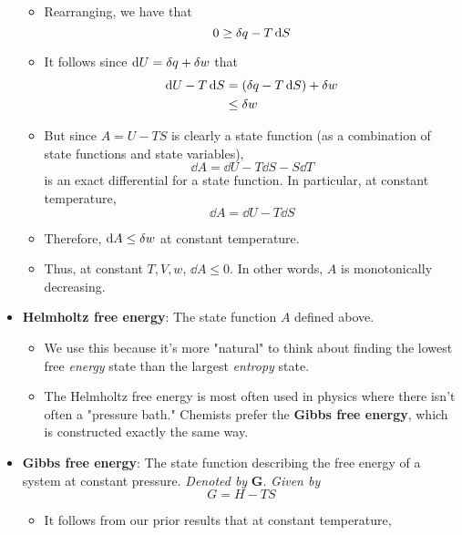 \documentclass[../notes.tex]{subfiles}
\begin{document}
\begin{itemize}
\begin{itemize}
        \item Rearranging, we have that
        \begin{equation*}
            0 \geq \var{q}-T\dd{S}
        \end{equation*}
        \item It follows since $\dd{U}=\var{q}+\var{w}$ that
        \begin{align*}
            \dd{U}-T\dd{S} &= (\var{q}-T\dd{S})+\var{w}\\
            &\leq \var{w}
        \end{align*}
        \item But since $A=U-TS$ is clearly a state function (as a combination of state functions and state variables),
        \begin{equation*}
            \dd{A} = \dd{U}-T\dd{S}-S\dd{T}
        \end{equation*}
        is an exact differential for a state function. In particular, at constant temperature,
        \begin{equation*}
            \dd{A} = \dd{U}-T\dd{S}
        \end{equation*}
        \item Therefore, $\dd{A}\leq\var{w}$ at constant temperature.
        \item Thus, at constant $T,V,w$, $\dd{A}\leq 0$. In other words, $A$ is monotonically decreasing.
    \end{itemize}
    \item \textbf{Helmholtz free energy}: The state function $A$ defined above.
    \begin{itemize}
        \item We use this because it's more "natural" to think about finding the lowest free \emph{energy} state than the largest \emph{entropy} state.
        \item The Helmholtz free energy is most often used in physics where there isn't often a "pressure bath." Chemists prefer the \textbf{Gibbs free energy}, which is constructed exactly the same way.
    \end{itemize}
    \item \textbf{Gibbs free energy}: The state function describing the free energy of a system at constant pressure. \emph{Denoted by} $\bm{G}$. \emph{Given by}
    \begin{equation*}
        G = H-TS
    \end{equation*}
    \begin{itemize}
        \item It follows from our prior results that at constant temperature,

\end{itemize}
\end{itemize}
\end{document}
